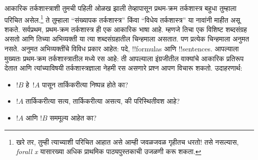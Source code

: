 \documentclass[../../../include/open-logic-section]{subfiles}
\begin{document}


आकारिक तर्कशास्त्राशी तुमची पहिली ओळख झाली तेव्हापासून प्रथम-क्रम
तर्कशास्त्र बहुधा तुम्हाला परिचित असेल.\footnote{खरे तर, तुम्ही त्याच्याशी
परिचित आहात असे आम्ही जवळजवळ गृहीतच धरतो!{} तसे नसल्यास,
\emph{forall x} \citep{Magnus2021} यासारख्या अधिक प्राथमिक
पाठ्यपुस्तकाची उजळणी करू शकता.} ते तुम्हाला ``संख्यापक तर्कशास्त्र''
किंवा ``विधेय तर्कशास्त्र'' या नावांनी माहीत असू शकते. सर्वप्रथम,
प्रथम-क्रम तर्कशास्त्र ही एक आकारिक भाषा आहे. म्हणजे तिचा एक विशिष्ट
शब्दसंग्रह असतो आणि तिच्या अभिव्यक्ती या त्या शब्दसंग्रहातील चिन्हमाला
असतात. पण प्रत्येक चिन्हमाला अनुमत नसते. अनुमत अभिव्यक्तींचे विविध
प्रकार आहेत: पदे, !!{formula}s आणि !!{sentence}s. आपल्याला मुख्यतः
प्रथम-क्रम तर्कशास्त्रातील मध्ये रस आहे: ती आपल्याला
इंग्रजीतील वाक्यांचे आकारिक प्रतिरूप देतात आणि त्यांच्याविषयी
तर्कशास्त्रज्ञाला नेहमी रस असणारे प्रश्न आपण विचारू शकतो. उदाहरणार्थ:
\begin{itemize}
    \item $!B$ हे~$!A$ पासून तार्किकरीत्या निष्पन्न होते का?
    \item $!A$ तार्किकरीत्या सत्य, तार्किकरीत्या असत्य, की
परिस्थितीवश आहे?
    \item $!A$ आणि $!B$ सममूल्य आहेत का?
\end{itemize}
\end{document}
